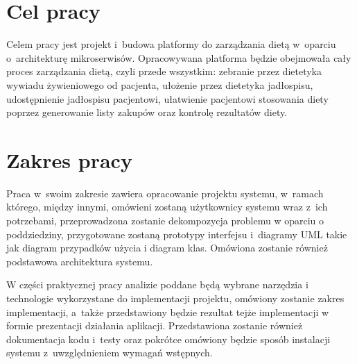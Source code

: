 \section*{Cel pracy}\label{sec:thesis-goal}

Celem pracy jest projekt i~budowa platformy do zarządzania dietą w~oparciu o~architekturę mikroserwisów.
Opracowywana platforma będzie obejmowała cały proces zarządzania dietą, czyli przede wszystkim:
zebranie przez dietetyka wywiadu żywieniowego od pacjenta,
ułożenie przez dietetyka jadłospisu,
udostępnienie jadłospisu pacjentowi,
ułatwienie pacjentowi stosowania diety poprzez generowanie listy zakupów
oraz kontrolę rezultatów diety.

\section*{Zakres pracy}\label{sec:scope-of-work}

Praca w~swoim zakresie zawiera opracowanie projektu systemu, w~ramach którego, między innymi,
omówieni zostaną użytkownicy systemu wraz z~ich potrzebami,
przeprowadzona zostanie dekompozycja problemu w oparciu o poddziedziny,
przygotowane zostaną prototypy interfejsu i~diagramy UML takie jak diagram przypadków użycia i diagram klas.
Omówiona zostanie również podstawowa architektura systemu.
\par
W części praktycznej pracy analizie poddane będą wybrane narzędzia i technologie wykorzystane do implementacji projektu,
omówiony zostanie zakres implementacji, a~także przedstawiony będzie rezultat tejże implementacji w formie prezentacji działania aplikacji.
Przedstawiona zostanie również dokumentacja kodu i~testy oraz pokrótce omówiony będzie sposób instalacji systemu z~uwzględnieniem wymagań wstępnych.

\thispagestyle{normal}
